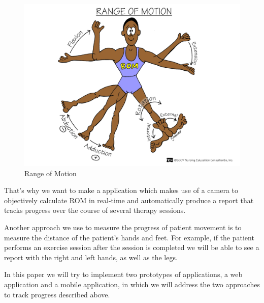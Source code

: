 \begin{figure}[htbp]
	\centerline{\includegraphics[scale=0.25]{fig/rangeofmotion.png}}  
  \caption{Range of Motion \cite{rangeofmotion}}
  \label{fig:rom-exemple}
\end{figure}

\par That's why we want to make a application which makes use of a camera to objectively 
calculate ROM in real-time and automatically produce a report that tracks progress over the course 
of several therapy sessions.

Another approach we use to measure the progress of patient movement is 
to measure the distance of the patient's hands and feet. For example, 
if the patient performs an exercise session after the session is completed we will 
be able to see a report with the right and left hands, as well as the legs.

In this paper we will try to implement two prototypes of applications, 
a web application and a mobile application, 
in which we will address the two approaches to track progress described above.

